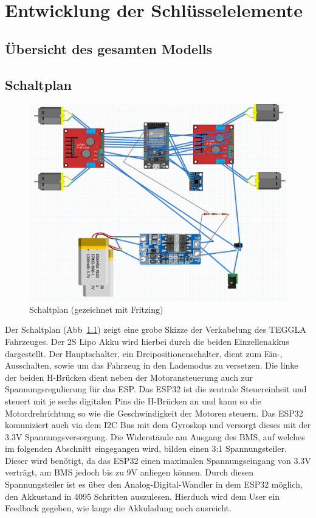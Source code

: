 \chapter{Entwicklung der Schlüsselelemente}
\section{Übersicht des gesamten Modells}

\section{Schaltplan}
\begin{figure}[!ht]
	\centering
	\includegraphics[width=\textwidth]{bilder/schaltplan.png}
	\caption{Schaltplan (gezeichnet mit Fritzing)}
	\label{bild:schaltpaln}
\end{figure}
Der Schaltplan (Abb~\ref{bild:schaltpaln}) zeigt eine grobe Skizze der Verkabelung des TEGGLA Fahrzeuges. Der 2S Lipo Akku wird hierbei durch die beiden Einzellenakkus dargestellt.
Der Hauptschalter, ein Dreipositionenschalter, dient zum Ein-, Ausschalten, sowie um das Fahrzeug in den Lademodus zu versetzen. 
Die linke der beiden H-Brücken dient neben der Motoransteuerung auch zur Spannungsregulierung für das ESP. 
Das ESP32 ist die zentrale Steuereinheit und steuert mit je sechs digitalen Pins die H-Brücken an und kann so die Motordrehrichtung so wie die Geschwindigkeit der Motoren steuern.
Das ESP32 komuniziert auch via dem I2C Bus mit dem Gyroskop und versorgt dieses mit der 3.3V Spannungsversorgung.
Die Widerstände am Ausgang des BMS, auf welches im folgenden Abschnitt eingegangen wird, bilden einen 3:1 Spannungsteiler.
Dieser wird benötigt, da das ESP32 einen maximalen Spannungseingang von 3.3V verträgt, am BMS jedoch bis zu 9V anliegen können. Durch diesen Spannungsteiler ist es über den Analog-Digital-Wandler in dem ESP32 möglich, den Akkustand in 4095 Schritten auszulesen.
Hierduch wird dem User ein Feedback gegeben, wie lange die Akkuladung noch ausreicht.

